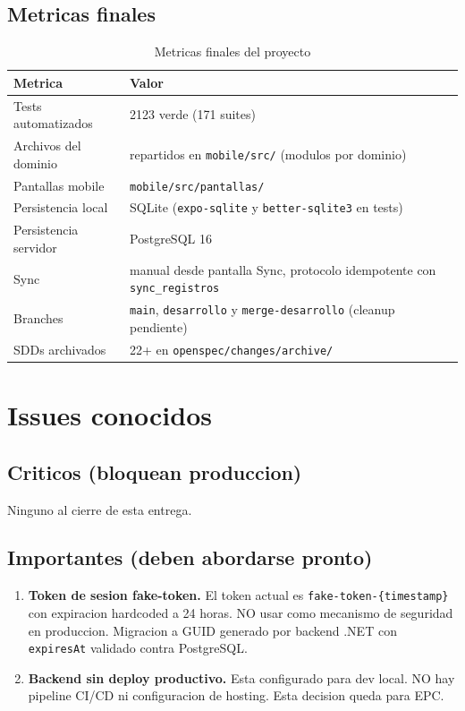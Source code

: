 \documentclass[11pt,a4paper,oneside]{report}
\begin{document}
\section{Metricas finales}

\begin{table}[h]
\centering
\caption{Metricas finales del proyecto}
\begin{tabularx}{\textwidth}{L{5cm} X}
\toprule
\textbf{Metrica} & \textbf{Valor} \\
\midrule
Tests automatizados & 2123 verde (171 suites) \\
Archivos del dominio & repartidos en \texttt{mobile/src/} (modulos por dominio) \\
Pantallas mobile & \texttt{mobile/src/pantallas/} \\
Persistencia local & SQLite (\texttt{expo-sqlite} y \texttt{better-sqlite3} en tests) \\
Persistencia servidor & PostgreSQL 16 \\
Sync & manual desde pantalla Sync, protocolo idempotente con \texttt{sync\_registros} \\
Branches & \texttt{main}, \texttt{desarrollo} y \texttt{merge-desarrollo} (cleanup pendiente) \\
SDDs archivados & 22+ en \texttt{openspec/changes/archive/} \\
\bottomrule
\end{tabularx}
\end{table}


\chapter{Issues conocidos}

\section{Criticos (bloquean produccion)}

Ninguno al cierre de esta entrega.

\section{Importantes (deben abordarse pronto)}

\begin{enumerate}[leftmargin=*]
    \item \textbf{Token de sesion fake-token.} El token actual es \texttt{fake-token-\{timestamp\}} con expiracion hardcoded a 24 horas. NO usar como mecanismo de seguridad en produccion. Migracion a GUID generado por backend .NET con \texttt{expiresAt} validado contra PostgreSQL.
    \item \textbf{Backend sin deploy productivo.} Esta configurado para dev local. NO hay pipeline CI/CD ni configuracion de hosting. Esta decision queda para EPC.
\end{enumerate}
\end{document}
